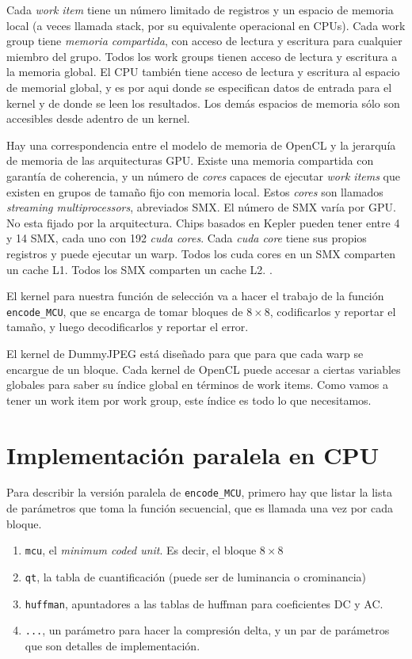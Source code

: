 Cada \emph{work item} tiene un número limitado de registros y un espacio de
memoria local (a veces llamada stack, por su equivalente operacional en CPUs).
Cada work group tiene \emph{memoria compartida}, con acceso de lectura y
escritura para cualquier miembro del grupo. Todos los work groups tienen acceso
de lectura y escritura a la memoria global. El CPU también tiene acceso de
lectura y escritura al espacio de memorial global, y es por aqui donde se
especifican datos de entrada para el kernel y de donde se leen los resultados.
Los demás espacios de memoria sólo son accesibles desde adentro de un kernel.

Hay una correspondencia entre el modelo de memoria de OpenCL y la jerarquía de
memoria de las arquitecturas GPU. Existe una memoria compartida con garantía de
coherencia, y un número de \emph{cores} capaces de ejecutar \emph{work items}
que existen en grupos de tamaño fijo con memoria local. Estos \emph{cores} son
llamados \emph{streaming multiprocessors}, abreviados SMX. El número de SMX
varía por GPU. No esta fijado por la arquitectura. Chips basados en Kepler
pueden tener entre 4 y 14 SMX, cada uno con 192 \emph{cuda cores}. Cada
\emph{cuda core} tiene sus propios registros y puede ejecutar un warp. Todos
los cuda cores en un SMX comparten un cache L1. Todos los SMX comparten un
cache L2. \cite{kepler-notes}.

El kernel para nuestra función de selección va a hacer el trabajo de la función
\verb+encode_MCU+, que se encarga de tomar bloques de $8\times8$, codificarlos
y reportar el tamaño, y luego decodificarlos y reportar el error.

El kernel de DummyJPEG está diseñado para que para que cada warp se encargue de
un bloque.  Cada kernel de OpenCL puede accesar a ciertas variables globales
para saber su índice global en términos de work items. Como vamos a tener un
work item por work group, este índice es todo lo que necesitamos.

\section{Implementación paralela en CPU}

Para describir la versión paralela de \verb+encode_MCU+, primero hay que listar
la lista de parámetros que toma la función secuencial, que es llamada una vez
por cada bloque.

\begin{enumerate}
    \item \verb+mcu+, el \emph{minimum coded unit}. Es decir, el bloque $8\times8$
    \item \verb+qt+, la tabla de cuantificación (puede ser de luminancia o crominancia)
    \item \verb+huffman+, apuntadores a las tablas de huffman para coeficientes DC y AC.
    \item \verb+...+, un parámetro para hacer la compresión delta, y un par de parámetros que son detalles de implementación.
\end{enumerate}

